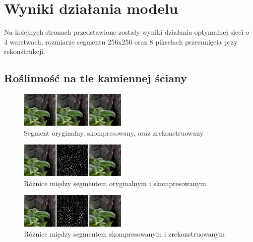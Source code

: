 \documentclass[a4paper, 12pt]{article}
\begin{document}
\section{Wyniki działania modelu}
Na kolejnych stronach przedstawione zostały wyniki działania optymalnej sieci o 4 warstwach,
rozmiarze segmentu 256x256 oraz 8 pikselach przesunięcia przy rekonstrukcji.
\newpage
\subsection{Roślinność na tle kamiennej ściany}
\begin{figure}[h!]
\begin{center}
	\includegraphics[width=0.85\columnwidth]{compare_sample.png}
	\caption{Segment oryginalny, skompresowany, oraz zrekonstruowany}
\end{center}
\end{figure}
\begin{figure}[h!]
\begin{center}
	\includegraphics[width=0.85\columnwidth]{orig_vs_comp.png}
	\caption{Różnice między segmentem oryginalnym i skompresowanym}
\end{center}
\end{figure}
\begin{figure}[h!]
\begin{center}
	\includegraphics[width=0.85\columnwidth]{comp_vs_rest.png}
	\caption{Różnice między segmentem skompresowanym i zrekonstruowanym}
\end{center}
\end{figure}
\end{document}
